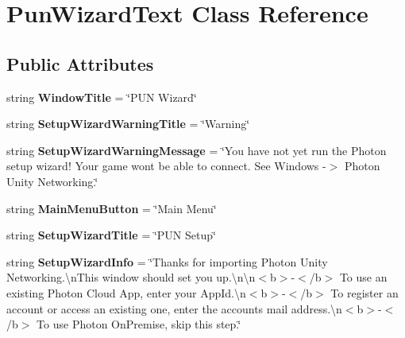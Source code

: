 \hypertarget{class_pun_wizard_text}{}\section{Pun\+Wizard\+Text Class Reference}
\label{class_pun_wizard_text}
\subsection*{Public Attributes}
\begin{DoxyCompactItemize}
\item 
string {\bfseries Window\+Title} = \char`\"{}P\+UN Wizard\char`\"{}\hypertarget{class_pun_wizard_text_aa2243e01e25e6c918919d3a493c0ea57}{}\label{class_pun_wizard_text_aa2243e01e25e6c918919d3a493c0ea57}

\item 
string {\bfseries Setup\+Wizard\+Warning\+Title} = \char`\"{}Warning\char`\"{}\hypertarget{class_pun_wizard_text_ab212b87edb1bf02b98e1ad7e5331b2a4}{}\label{class_pun_wizard_text_ab212b87edb1bf02b98e1ad7e5331b2a4}

\item 
string {\bfseries Setup\+Wizard\+Warning\+Message} = \char`\"{}You have not yet run the Photon setup wizard! Your game won\textquotesingle{}t be able to connect. See Windows -\/$>$ Photon Unity Networking.\char`\"{}\hypertarget{class_pun_wizard_text_a35b799fca80324591711e773435a1837}{}\label{class_pun_wizard_text_a35b799fca80324591711e773435a1837}

\item 
string {\bfseries Main\+Menu\+Button} = \char`\"{}Main Menu\char`\"{}\hypertarget{class_pun_wizard_text_a090688891cabaa9dac36c28a9902ad20}{}\label{class_pun_wizard_text_a090688891cabaa9dac36c28a9902ad20}

\item 
string {\bfseries Setup\+Wizard\+Title} = \char`\"{}P\+UN Setup\char`\"{}\hypertarget{class_pun_wizard_text_a22ff0b63d4b3aa7c5502863e6ad2e675}{}\label{class_pun_wizard_text_a22ff0b63d4b3aa7c5502863e6ad2e675}

\item 
string {\bfseries Setup\+Wizard\+Info} = \char`\"{}Thanks for importing Photon Unity Networking.\textbackslash{}n\+This window should set you up.\textbackslash{}n\textbackslash{}n$<$b$>$-\/$<$/b$>$ To use an existing Photon Cloud App, enter your App\+Id.\textbackslash{}n$<$b$>$-\/$<$/b$>$ To register an account or access an existing one, enter the account\textquotesingle{}s mail address.\textbackslash{}n$<$b$>$-\/$<$/b$>$ To use Photon On\+Premise, skip this step.\char`\"{}\hypertarget{class_pun_wizard_text_a503b62f5d16e879aeb94d23cfc37a9cb}{}\label{class_pun_wizard_text_a503b62f5d16e879aeb94d23cfc37a9cb}


\end{DoxyCompactItemize}
